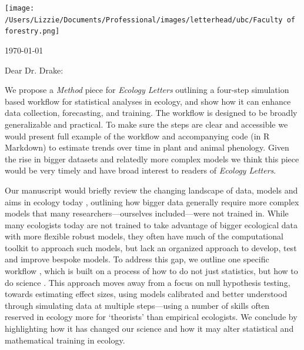 \documentclass[11pt]{article}
\begin{document}

\renewcommand{\refname}{\CHead{}}

\hspace{-5ex} \texttt{[image: /Users/Lizzie/Documents/Professional/images/letterhead/ubc/Faculty of forestry.png]}
\vspace{1.5ex}\\

\setlength{\parindent}{0pt}
\setlength{\parskip}{7pt}

\today

Dear Dr. Drake:

We propose a \emph{Method} piece for \emph{Ecology Letters} outlining a four-step simulation based workflow for statistical analyses in ecology, and show how it can enhance data collection, forecasting, and training. The workflow is designed to be broadly generalizable and practical. To make sure the steps are clear and accessible we would present full example of the workflow and accompanying code (in R Markdown) to estimate trends over time in plant and animal phenology. Given the rise in bigger datasets and relatedly more complex models we think this piece would be very timely and have broad interest to readers of \emph{Ecology Letters}.


Our manuscript would briefly review the changing landscape of data, models and aims in ecology today \citep{anderson2021trends,muff2022rewriting}, outlining how bigger data generally require more complex models that many researchers---ourselves included---were not trained in. While many ecologists today are not trained to take advantage of bigger ecological data with more flexible robust models, they often have much of the computational toolkit to approach such models, but lack an organized approach to develop, test and improve bespoke models. To address this gap, we outline one specific workflow \citep[see Fig. \ref{fig:workflow} below, and see][]{betanworkflow,grinsztajn2021,vandeschoot2021}, which is built on a process of how to do not just statistics, but how to do science \citep{box1976science}. This approach  moves away from a focus on null hypothesis testing, towards estimating effect sizes, using models calibrated and better understood through simulating data at multiple steps---using a number of skills often reserved in ecology more for `theorists' than empirical ecologists. We conclude by highlighting how it has changed our science and how it may alter statistical and mathematical training in ecology. 
\end{document}

